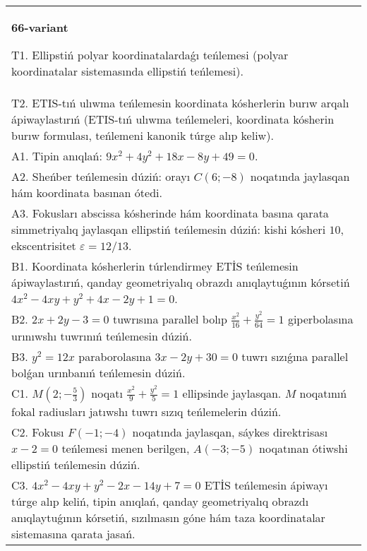 \documentclass{article}
\begin{document}
\begin{tabular}{m{17cm}}
\textbf{66-variant}
\newline

T1. Ellipstiń polyar koordinatalardaǵı teńlemesi (polyar koordinatalar sistemasında ellipstiń teńlemesi).\\

T2. ETIS-tıń ulıwma teńlemesin koordinata kósherlerin burıw arqalı ápiwaylastırıń (ETIS-tıń ulıwma teńlemeleri, koordinata kósherin burıw formulası, teńlemeni kanonik túrge alıp keliw).\\

A1. Tipin anıqlań: $9 x^{2}+4 y^{2}+18 x-8 y+49=0$.\\

A2. Sheńber teńlemesin dúziń: orayı $C (6 ;-8) $ noqatında jaylasqan hám koordinata basınan ótedi.\\

A3. Fokusları abscissa kósherinde hám koordinata basına qarata simmetriyalıq jaylasqan ellipstiń teńlemesin dúziń: kishi kósheri $10$, ekscentrisitet $\varepsilon=12/13$.\\

B1. Koordinata kósherlerin túrlendirmey ETİS teńlemesin ápiwaylastırıń, qanday geometriyalıq obrazdı anıqlaytuǵının kórsetiń $4x^{2} - 4xy + y^{2} + 4x - 2y + 1 = 0$.  \\

B2. $2x + 2y - 3 = 0$ tuwrısına parallel bolıp $\frac{x^{2}}{16} + \frac{y^{2}}{64} = 1$ giperbolasına urınıwshı tuwrınıń teńlemesin dúziń.  \\

B3. $y^{2} = 12x$ paraborolasına $3x - 2y + 30 = 0$ tuwrı sızıǵına parallel bolǵan urınbanıń teńlemesin dúziń.  \\

C1. $M(2; - \frac{5}{3})$ noqatı $\frac{x^{2}}{9} + \frac{y^{2}}{5} = 1$ ellipsinde jaylasqan. $M$ noqatınıń fokal radiusları jatıwshı tuwrı sızıq teńlemelerin dúziń.  \\

C2. Fokusı $F( - 1; - 4)$ noqatında jaylasqan, sáykes direktrisası $x - 2 = 0$ teńlemesi menen berilgen, $A( - 3; - 5)$ noqatınan ótiwshi ellipstiń teńlemesin dúziń.  \\

C3. $4x^{2} - 4xy + y^{2} - 2x - 14y + 7 = 0$ ETİS teńlemesin ápiwayı túrge alıp keliń, tipin anıqlań, qanday geometriyalıq obrazdı anıqlaytuǵının kórsetiń, sızılmasın góne hám taza koordinatalar sistemasına qarata jasań.  \\

\end{tabular}
\vspace{1cm}
\end{document}
